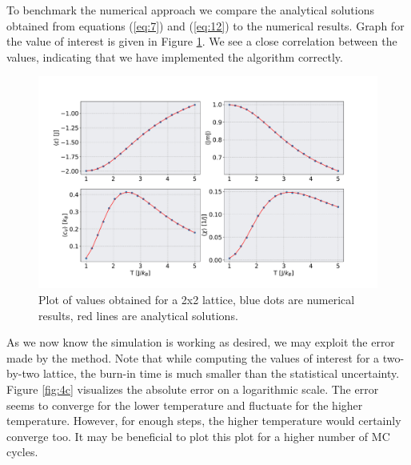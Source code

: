 \documentclass[english,notitlepage,reprint,nofootinbib]{revtex4-1}  %
\begin{document}
To benchmark the numerical approach we compare the analytical solutions obtained from equations (\ref{eq:7}) and (\ref{eq:12}) to the numerical results. Graph for the value of interest is given in Figure \ref{fig:4b}. We see a close correlation between the values, indicating that we have implemented the algorithm correctly.  


\begin{figure}[h!]
    \centering %
    \includegraphics[scale=0.2]{figures/4b.pdf} %
    \caption{Plot of values obtained for a 2x2 lattice, blue dots are numerical results, red lines are analytical solutions.}
    \label{fig:4b}
\end{figure}


As we now know the simulation is working as desired, we may exploit the error made by the method. Note that while computing the values of interest for a two-by-two lattice, the burn-in time is much smaller than the statistical uncertainty. Figure \ref{fig:4c} visualizes the absolute error on a logarithmic scale. The error seems to converge for the lower temperature and fluctuate for the higher temperature. However, for enough steps, the higher temperature would certainly converge too. It may be beneficial to plot this plot for a higher number of MC cycles.
\end{document}
